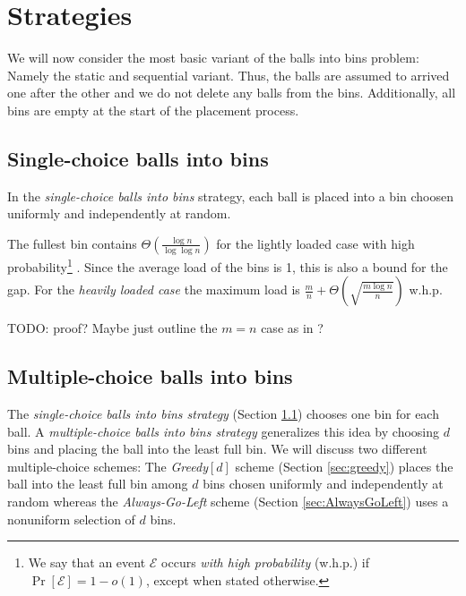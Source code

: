 \documentclass{acm_proc_article-sp}
\begin{document}
\section{Strategies}
\label{sec:strategies}
We will now consider the most basic variant of the balls into bins problem: Namely the static and sequential variant. Thus, the balls are assumed to arrived one after the other and we do not delete any balls from the bins. Additionally, all bins are empty at the start of the placement process.

\subsection{Single-choice balls into bins}
\label{sec:single-choice}
In the \emph{single-choice balls into bins} strategy, each ball is placed into a bin choosen uniformly and independently at random. 

The fullest bin contains $\Theta \left( \frac{\log n}{\log \log n} \right)$ for the lightly loaded case with high probability\footnote{We say that an event $\mathcal E$ occurs \emph{with high probability} (w.h.p.) if $\Pr\left[\mathcal E \right] = 1 - o(1)$, except when stated otherwise.} \cite{RS98}. Since the average load of the bins is 1, this is also a bound for the gap. 
For the \emph{heavily loaded case} the maximum load is $\frac{m}{n} + \Theta\left(\sqrt{\frac{m \log n}{n}}\right)$ w.h.p.

TODO: proof? Maybe just outline the $m = n$ case as in \cite{RS98}?

\subsection{Multiple-choice balls into bins}
\label{sec:multiple-choice}
The \emph{single-choice balls into bins strategy} (Section \ref{sec:single-choice}) chooses one bin for each ball. A \emph{multiple-choice balls into bins strategy} generalizes this idea by choosing $d$ bins and placing the ball into the least full bin. We will discuss two different multiple-choice schemes: The \emph{Greedy$[d]$} scheme (Section \ref{sec:greedy}) places the ball into the least full bin among $d$ bins chosen uniformly and independently at random whereas the \emph{Always-Go-Left} scheme (Section \ref{sec:AlwaysGoLeft}) uses a nonuniform selection of $d$ bins.
\end{document}
